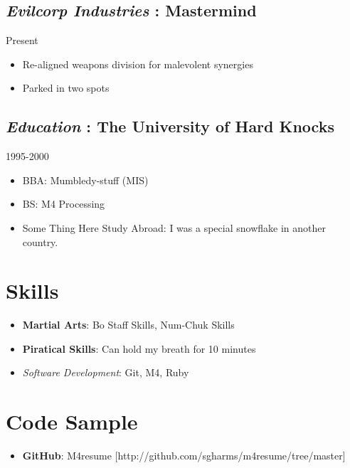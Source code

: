 \documentclass[]{article}
\begin{document}
\subsection*{\textit{Evilcorp Industries} : \textbf{Mastermind}}
  \label{_evilcorpindustries_mastermind}
  \textsf{Present}
      
\begin{itemize}
    \item Re-aligned weapons division for malevolent synergies
    \item Parked in two spots
\end{itemize}
       
\subsection*{\textit{Education} : \textbf{The University of Hard Knocks}}
  \label{_education_theuniversityofhardknocks}
  \textsf{1995-2000}
      
\begin{itemize}
    \item BBA:  Mumbledy-stuff (MIS)
    \item BS:  M4 Processing
    \item Some Thing Here Study Abroad: I was a special snowflake in another country.
\end{itemize}
       


  \section*{ Skills }
   \begin{itemize}
     \item \textbf{Martial Arts}: Bo Staff Skills, Num-Chuk Skills
     \item \textbf{Piratical Skills}: Can hold my breath for 10 minutes
     \item \textit{Software Development}: Git, M4, Ruby
   \end{itemize}







  \section*{ Code Sample }
   \begin{itemize}
     \item \textbf{GitHub}: M4resume [\textsf{http://github.com/sgharms/m4resume/tree/master}]
   \end{itemize}
\end{document}

